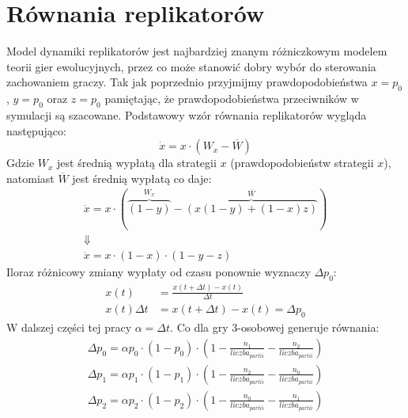 \section{Równania replikatorów}
\label{sec:r_repli}
Model dynamiki replikatorów jest najbardziej znanym różniczkowym modelem teorii gier ewolucyjnych, przez co może stanowić dobry wybór do sterowania zachowaniem graczy. Tak jak poprzednio przyjmijmy prawdopodobieństwa $x=p_0$, $y=p_0$ oraz $z=p_0$ pamiętając, że prawdopodobieństwa przeciwników w symulacji są szacowane. Podstawowy wzór równania replikatorów wygląda następująco:
\begin{equation}
\dot{x} = x \cdot ( W_x - \overline{W})
\end{equation}
Gdzie $W_x$ jest średnią wypłatą dla strategii $x$ (prawdopodobieństw strategii $x$), natomiast $\overline{W}$ jest średnią wypłatą co daje:
\begin{gather*}
\dot{x} = x \cdot ( \overbrace{(1-y)}^{W_x} - \overbrace{(x(1-y) + (1-x)z)}^{\overline{W}}) \\
\Downarrow \\
\dot{x} = x \cdot (1-x) \cdot (1-y-z)
\end{gather*}
Iloraz różnicowy zmiany wypłaty od czasu ponownie wyznaczy $\Delta p_0$:
\begin{align*}
x(t) &= \frac{x(t+\Delta t)-x(t)}{\Delta t} \\
x(t) \Delta t &= x(t+\Delta t)-x(t) = \Delta p_0
\end{align*} 
W dalszej części tej pracy $\alpha=\Delta t$. Co dla gry 3-osobowej generuje równania:
\begin{align} \label{eq:repli}
\Delta p_0 = \alpha p_0 \cdot (1 - p_0) \cdot (1 - \frac{n_1}{liczba_{partii}} - \frac{n_2}{liczba_{partii}}) \nonumber \\
\Delta p_1 = \alpha p_1 \cdot (1 - p_1) \cdot (1 - \frac{n_2}{liczba_{partii}} - \frac{n_0}{liczba_{partii}}) \\
\Delta p_2 = \alpha p_2 \cdot (1 - p_2) \cdot (1 - \frac{n_0}{liczba_{partii}} - \frac{n_1}{liczba_{partii}}) \nonumber
\end{align} 



